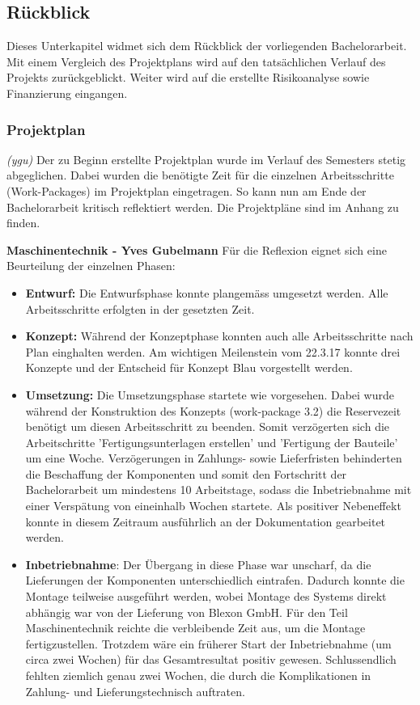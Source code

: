 \newpage
\subsection{Rückblick}
Dieses Unterkapitel widmet sich dem Rückblick der vorliegenden Bachelorarbeit. Mit einem Vergleich des Projektplans wird auf den tatsächlichen Verlauf des Projekts zurückgeblickt. Weiter wird auf die erstellte Risikoanalyse sowie Finanzierung eingangen.
\subsubsection{Projektplan}
\label{projektplan}
\textit{(ygu)} Der zu Beginn erstellte Projektplan wurde im Verlauf des Semesters stetig abgeglichen. Dabei wurden die benötigte Zeit für die einzelnen Arbeitsschritte (Work-Packages) im Projektplan eingetragen. So kann nun am Ende der Bachelorarbeit kritisch reflektiert werden. Die Projektpläne sind im Anhang zu finden.
\newline

\textbf{Maschinentechnik - Yves Gubelmann}
\newline
Für die  Reflexion eignet sich eine Beurteilung der einzelnen Phasen:
\begin{itemize}
	\item \textbf{Entwurf:} Die Entwurfsphase konnte plangemäss umgesetzt werden. Alle Arbeitsschritte erfolgten in der gesetzten Zeit.
	
	\item \textbf{Konzept:} Während der Konzeptphase konnten auch alle Arbeitsschritte nach Plan einghalten werden. Am wichtigen Meilenstein vom 22.3.17 konnte drei Konzepte und der Entscheid für Konzept Blau vorgestellt werden.
	
	\item \textbf{Umsetzung:} Die Umsetzungsphase startete wie vorgesehen. Dabei wurde während der Konstruktion des Konzepts (work-package 3.2) die Reservezeit benötigt um diesen Arbeitsschritt zu beenden. Somit verzögerten sich die Arbeitschritte 'Fertigungsunterlagen erstellen' und 'Fertigung der Bauteile' um eine Woche. Verzögerungen in Zahlungs- sowie Lieferfristen behinderten die Beschaffung der Komponenten und somit den Fortschritt der Bachelorarbeit um mindestens 10 Arbeitstage, sodass die Inbetriebnahme mit einer Verspätung von eineinhalb Wochen startete. Als positiver Nebeneffekt konnte in diesem Zeitraum ausführlich an der Dokumentation gearbeitet werden.
	
	\item \textbf{Inbetriebnahme}: Der Übergang in diese Phase war unscharf, da die Lieferungen der Komponenten unterschiedlich eintrafen. Dadurch konnte die Montage teilweise ausgeführt werden, wobei Montage des Systems direkt abhängig war von der Lieferung von Blexon GmbH. Für den Teil Maschinentechnik reichte die verbleibende Zeit aus, um die Montage fertigzustellen. Trotzdem wäre ein früherer Start der Inbetriebnahme (um circa zwei Wochen) für das Gesamtresultat positiv gewesen. Schlussendlich fehlten ziemlich genau zwei Wochen, die durch die Komplikationen in Zahlung- und Lieferungstechnisch auftraten.

	
\end{itemize} 

